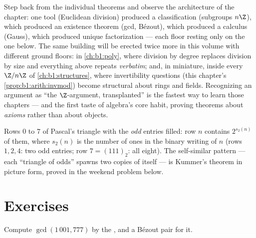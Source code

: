 \begin{remark}\label{rem:b1:arith:interlude}
Step back from the individual theorems and observe the
architecture of the chapter: one tool (Euclidean division)
produced a classification (subgroups $n\Z$), which produced an
existence theorem (gcd, Bézout), which produced a 
calculus (Gauss), which produced unique factorization --- each
floor resting only on the one below. The same building will be
erected twice more in this volume with different ground floors:
in \cref{ch:b1:poly}, where division by degree replaces division
by size and everything above repeats \emph{verbatim}; and, in
miniature, inside every $\Z/n\Z$ of \cref{ch:b1:structures},
where invertibility questions (this chapter's
\cref{prop:b1:arith:invmod}) become structural  about
rings and fields. Recognizing an argument as ``the $\Z$-argument,
transplanted'' is the fastest way to learn those chapters --- and
the first taste of algebra's core habit, proving theorems about
\emph{axioms} rather than about objects.
\end{remark}

\begin{omfigure}

{\small Rows $0$ to $7$ of Pascal's triangle with the \emph{odd}
entries filled: row $n$ contains $2^{s_2(n)}$ of them, where
$s_2(n)$ is the number of ones in the binary writing of $n$
(rows $1, 2, 4$: two odd entries; row $7 = (111)_2$: all eight).
The self-similar pattern --- each ``triangle of odds'' spawns two
copies of itself --- is Kummer's theorem in picture form, proved
in the weekend problem below.}
\end{omfigure}

\section{Exercises}

\begin{exercise}[$\star$]\label{exo:b1:arith:1}
Compute $\gcd(1\,001, 777)$ by the , and a Bézout
pair for it.
\end{exercise}

